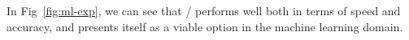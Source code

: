 
In Fig~\ref{fig:ml-exp}, we can see that \meta/ performs well both in
terms of speed and accuracy, and presents itself as a viable option in the
machine learning domain.



